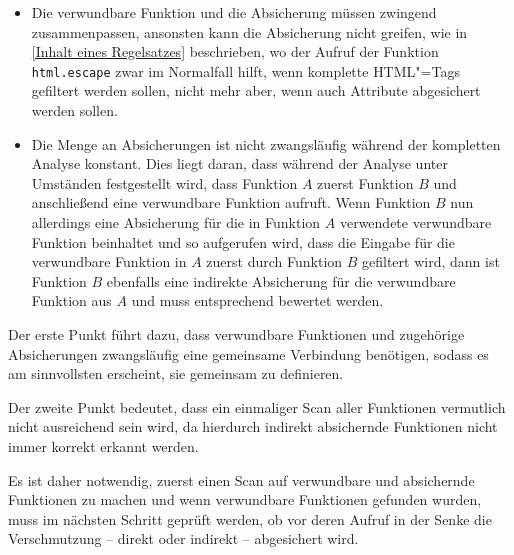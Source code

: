                 \begin{itemize}
                    \item Die verwundbare Funktion und
                      die Absicherung müssen zwingend zusammenpassen,
                      ansonsten kann die Absicherung nicht greifen,
                      wie in
                      \vref{Inhalt eines Regelsatzes} beschrieben,
                      wo der Aufruf der Funktion
                      \lstinline{html.escape} zwar im Normalfall hilft,
                      wenn komplette
                      \gls{HTML}"=Tags gefiltert werden sollen,
                      nicht mehr aber,
                      wenn auch Attribute abgesichert werden sollen.
                    \item Die Menge an Absicherungen ist nicht zwangsläufig während der kompletten Analyse konstant.
                      Dies liegt daran,
                      dass während der Analyse unter Umständen festgestellt wird,
                      dass Funktion
                      \( A \) zuerst Funktion
                      \( B \) und
                      anschließend eine verwundbare Funktion aufruft.
                      Wenn Funktion
                      \( B \) nun allerdings eine Absicherung für die in Funktion
                      \( A \) verwendete verwundbare Funktion beinhaltet und
                      so aufgerufen wird,
                      dass die Eingabe für die verwundbare Funktion in
                      \( A \) zuerst durch Funktion
                      \( B \) gefiltert wird,
                      dann ist Funktion
                      \( B \) ebenfalls eine indirekte Absicherung für die verwundbare Funktion aus
                      \( A \) und
                      muss entsprechend bewertet werden.
                \end{itemize}

                Der erste Punkt führt dazu,
                dass verwundbare Funktionen und
                zugehörige Absicherungen zwangsläufig eine gemeinsame Verbindung benötigen,
                sodass es am sinnvollsten erscheint,
                sie gemeinsam zu definieren.

                Der zweite Punkt bedeutet,
                dass ein einmaliger Scan aller Funktionen vermutlich nicht ausreichend sein wird,
                da hierdurch indirekt absichernde Funktionen nicht immer korrekt erkannt werden.

                Es ist daher notwendig,
                zuerst einen Scan auf verwundbare und
                absichernde Funktionen zu machen und
                wenn verwundbare Funktionen gefunden wurden,
                muss im nächsten Schritt geprüft werden,
                ob vor deren Aufruf in der Senke die Verschmutzung
                -- direkt oder
                indirekt
                -- abgesichert wird.

